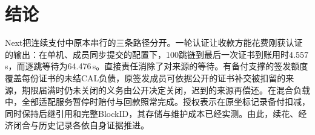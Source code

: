 \section{结论}
\label{sec:conclusion}

Next把连续支付中原本串行的三条路径分开。一轮认证让收款方能花费刚获认证的输出：在单机、成员同步提交的配置下，100跳链到最后一次证书到账用时4.557\,s，而逐跳等待为64.476\,s。直接责任消除了对来源的等待。有备付支撑的签发额度覆盖每份证书的未结CAL负债，原签发成员可依据公开的证书补交被扣留的来源，期限届满时仍未关闭的义务由公开决定关闭，迟到的来源再偿还。在混合负载中，全部适配服务暂停时赔付与回款照常完成。授权表示在原坐标记录备付扣减，同时保持后继引用和完整BlockID，其存储与维护成本已经实测。由此，续花、经济闭合与历史记录各依自身证据推进。